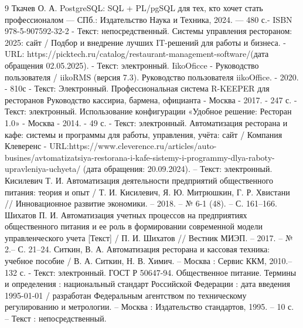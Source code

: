 \begin{thebibliography}{9}
     Ткачев О. А.  PostgreSQL: SQL + PL/pgSQL для тех, кто хочет стать профессионалом — СПб.: Издательство Наука и Техника, 2024. — 480 с.- ISBN 978-5-907592-32-2 - Текст: непосредственный.
     Системы управления рестораном: 2025: сайт / Подбор и внедрение лучших IT-решений для работы и бизнеса. - URL: https://picktech.ru/catalog/restaurant-management-software/(дата обращения 02.05.2025). - Текст: электронный.
	 IikoOficce - Руководство пользователя / iikoRMS (версия 7.3). Руководство пользователя iikoOffice. - 2020. - 810с - Текст: Электронный.
	 Профессиональная система R-KEEPER для ресторанов Руководство кассириа, бармена, официанта - Москва - 2017. - 247 с. - Текст: электронный. 
	 Использование конфигурации «Удобное решение: Ресторан 1.0» - Москва - 2014. - 49 с. - Текст: электронный.
	 Автоматизация ресторана и кафе: системы и программы для работы, управления, учёта: сайт / Компания Клеверенс - URL:https://www.cleverence.ru/articles/auto-busines/avtomatizatsiya-restorana-i-kafe-sistemy-i-programmy-dlya-raboty-upravleniya-uchyeta/ (дата обращения: 20.09.2024). – Текст: электронный.
	 Кисилевич Т. И. Автоматизация деятельности предприятий общественного питания: теория и опыт / Т. И. Кисилевич, Я. Ю. Митрюшкин, Г. Р. Хвистани // Инновационное развитие экономики. – 2018. – № 6-1 (48). – С. 161–166.
	 Шихатов П. И. Автоматизация учетных процессов на предприятиях общественного питания и ее роль в формировании современной модели управленческого учета [Текст] / П. И. Шихатов // Вестник МИЭП. – 2017. – № 2.– С. 21–24. 
	 Ситкин, В. А. Автоматизация ресторана и кассовая техника: учебное пособие / В. А. Ситкин, Н. В. Химич. – Москва : Сервис ККМ, 2010.– 132 с.  - Текст: электронный. 
	ГОСТ Р 50647-94. Общественное питание. Термины и определения : национальный стандарт Российской Федерации : дата введения 1995-01-01 / разработан Федеральным агентством по техническому регулированию и метрологии. – Москва : Издательство стандартов, 1995. – 10 с. – Текст : непосредственный.
\end{thebibliography}

